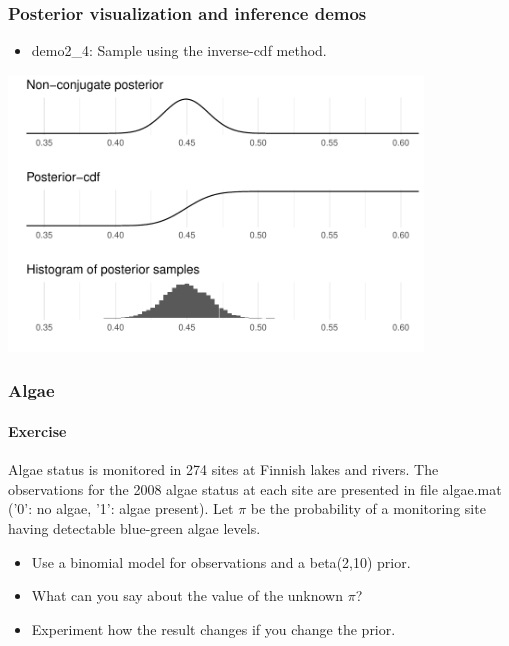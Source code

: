 \documentclass[english,t]{beamer}
\renewcommand{\emph}[1]{\textcolor{navyblue}{#1}}
\begin{document}
\begin{frame}
  \frametitle{Posterior visualization and inference demos}

  \begin{itemize}
  \item demo2\_4: Sample using the inverse-cdf method.
  \end{itemize}
  \includegraphics[width=11cm]{figs/demo2_4b.pdf}
\end{frame}

\begin{frame}
  \frametitle{Algae}
  \framesubtitle{Exercise}

Algae status is monitored in 274 sites at Finnish lakes and rivers. 
The observations for the 2008 algae status at each site are presented
in file \emph{algae.mat} ('0': no algae, '1': algae present). 
Let $\pi$ be the probability of a monitoring site having detectable
blue-green algae levels. 

\begin{itemize}
\item Use a binomial model for observations and a \emph{beta}(2,10) prior.
\item What can you say about the value of the unknown $\pi$?
\item Experiment how the result changes if you change the prior.
\end{itemize}

\end{frame}

\end{document}
